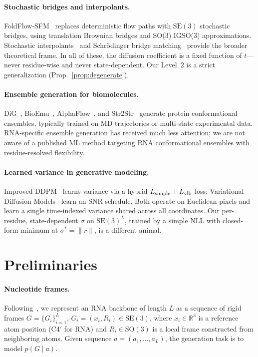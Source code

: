 \documentclass{article}
\theoremstyle{remark}
\theoremstyle{definition}
\newcommand{\R}{\mathbb{R}}
\newcommand{\SO}{\mathrm{SO}}
\newcommand{\SE}{\mathrm{SE}}
\begin{document}
\paragraph{Stochastic bridges and interpolants.}
FoldFlow-SFM~\citep{foldflow} replaces deterministic flow paths with $\SE(3)$
stochastic bridges, using translation Brownian bridges and SO(3) IGSO(3)
approximations. Stochastic interpolants~\citep{stochasticinterpolants} and
Schr\"odinger bridge matching~\citep{shi2023dsbm} provide the broader theoretical
frame. In all of these, the diffusion coefficient is a fixed function of
$t$---never residue-wise and never state-dependent. Our Level~2 is a strict
generalization (Prop.~\ref{prop:degenerate}).

\paragraph{Ensemble generation for biomolecules.}
DiG~\citep{dig}, BioEmu~\citep{bioemu}, AlphaFlow~\citep{alphaflow}, and
Str2Str~\citep{str2str} generate protein conformational ensembles, typically
trained on MD trajectories or multi-state experimental data. RNA-specific
ensemble generation has received much less attention; we are not aware of a
published ML method targeting RNA conformational ensembles with
residue-resolved flexibility.

\paragraph{Learned variance in generative modeling.}
Improved DDPM~\citep{improveddpm} learns variance via a hybrid $L_{\text{simple}}
+\nobreak L_{\text{vlb}}$ loss; Variational Diffusion Models~\citep{vdm} learn
an SNR schedule. Both operate on Euclidean pixels and learn a single
time-indexed variance shared across all coordinates. Our per-residue,
state-dependent $\sigma$ on $\SE(3)^L$, trained by a simple NLL with closed-form
minimum at $\sigma^{\ast}=\|r\|$, is a different animal.

\section{Preliminaries}
\label{sec:prelim}

\paragraph{Nucleotide frames.}
Following~\citet{rnaframeflow}, we represent an RNA backbone of length $L$ as a
sequence of rigid frames $G=\{G_i\}_{i=1}^L$, $G_i=(x_i, R_i)\in\SE(3)$, where
$x_i\in\R^3$ is a reference atom position (C4$'$ for RNA) and $R_i\in\SO(3)$ is
a local frame constructed from neighboring atoms. Given sequence
$a=(a_1,\ldots,a_L)$, the generation task is to model
$p(G\mid a)$.
\end{document}
